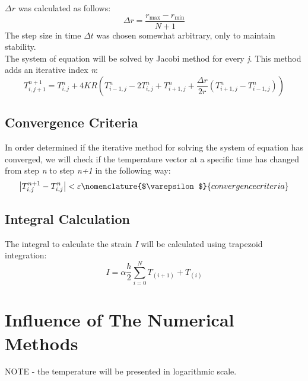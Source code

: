 \documentclass[11pt, a4paper]{article}
\begin{document}
\noindent $\Delta r$ was calculated as follows:
\begin{equation}
    \Delta r=\frac{r_\text{max}-r_\text{min}}{N+1}
\end{equation}
The step size in time $\Delta t$ was chosen somewhat arbitrary, only to maintain stability.\\

\noindent The system of equation will be solved by Jacobi method for every \emph{j}. This method adds an iterative index \emph{n}:
\begin{equation}
    \displaystyle T_{i,j+1}^{n+1}=T_{i,j}^n+4KR\left(T_{i-1,j}^n-2T_{i,j}^n+T_{i+1,j}^n+\frac{\Delta r}{2r}\left(T_{i+1,j}^n-T_{i-1,j}^n\right)\right)
\end{equation}

\subsection{Convergence Criteria}
In order determined if the iterative method for solving the system of equation has converged, we will check if the temperature vector at a specific time has changed from step \emph{n} to step \emph{n+1} in the following way:
\begin{equation}
    \left|T_{i,j}^{n+1}-T_{i,j}^n\right|<\varepsilon
    \nomenclature{$\varepsilon$}{convergence criteria}
\end{equation}

\subsection{Integral Calculation}
The integral to calculate the strain \emph{I} will be calculated using trapezoid integration:
\begin{equation}
    I=\alpha\frac{h}{2}\sum_{i=0}^{N}{T_{\left(i+1\right)}+T_{\left(i\right)}}
\end{equation}

\section{Influence of The Numerical Methods}
NOTE - the temperature will be presented in logarithmic scale.
\end{document}

